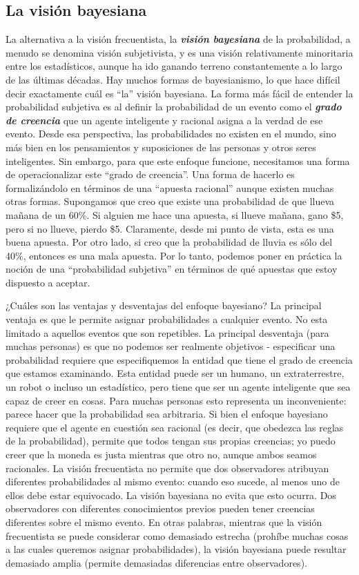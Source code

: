 \documentclass[spanish,]{book}
\begin{document}
\subsection{La visión bayesiana}\label{la-vision-bayesiana}

La alternativa a la visión frecuentista, la \textbf{\emph{visión
bayesiana}} de la probabilidad, a menudo se denomina visión
subjetivista, y es una visión relativamente minoritaria entre los
estadísticos, aunque ha ido ganando terreno constantemente a lo largo de
las últimas décadas. Hay muchos formas de bayesianismo, lo que hace
difícil decir exactamente cuál es ``la'' visión bayesiana. La forma más
fácil de entender la probabilidad subjetiva es al definir la
probabilidad de un evento como el \textbf{\emph{grado de creencia}} que
un agente inteligente y racional asigna a la verdad de ese evento. Desde
esa perspectiva, las probabilidades no existen en el mundo, sino más
bien en los pensamientos y suposiciones de las personas y otros seres
inteligentes. Sin embargo, para que este enfoque funcione, necesitamos
una forma de operacionalizar este ``grado de creencia''. Una forma de
hacerlo es formalizándolo en términos de una ``apuesta racional'' aunque
existen muchas otras formas. Supongamos que creo que existe una
probabilidad de que llueva mañana de un 60\%. Si alguien me hace una
apuesta, si llueve mañana, gano \$5, pero si no llueve, pierdo \$5.
Claramente, desde mi punto de vista, esta es una buena apuesta. Por otro
lado, si creo que la probabilidad de lluvia es sólo del 40\%, entonces
es una mala apuesta. Por lo tanto, podemos poner en práctica la noción
de una ``probabilidad subjetiva'' en términos de qué apuestas que estoy
dispuesto a aceptar.

¿Cuáles son las ventajas y desventajas del enfoque bayesiano? La
principal ventaja es que le permite asignar probabilidades a cualquier
evento. No esta limitado a aquellos eventos que son repetibles. La
principal desventaja (para muchas personas) es que no podemos ser
realmente objetivos - especificar una probabilidad requiere que
especifiquemos la entidad que tiene el grado de creencia que estamos
examinando. Esta entidad puede ser un humano, un extraterrestre, un
robot o incluso un estadístico, pero tiene que ser un agente inteligente
que sea capaz de creer en cosas. Para muchas personas esto representa un
inconveniente: parece hacer que la probabilidad sea arbitraria. Si bien
el enfoque bayesiano requiere que el agente en cuestión sea racional (es
decir, que obedezca las reglas de la probabilidad), permite que todos
tengan sus propias creencias; yo puedo creer que la moneda es justa
mientras que otro no, aunque ambos seamos racionales. La visión
frecuentista no permite que dos observadores atribuyan diferentes
probabilidades al mismo evento: cuando eso sucede, al menos uno de ellos
debe estar equivocado. La visión bayesiana no evita que esto ocurra. Dos
observadores con diferentes conocimientos previos pueden tener creencias
diferentes sobre el mismo evento. En otras palabras, mientras que la
visión frecuentista se puede considerar como demasiado estrecha (prohíbe
muchas cosas a las cuales queremos asignar probabilidades), la visión
bayesiana puede resultar demasiado amplia (permite demasiadas
diferencias entre observadores).
\end{document}
